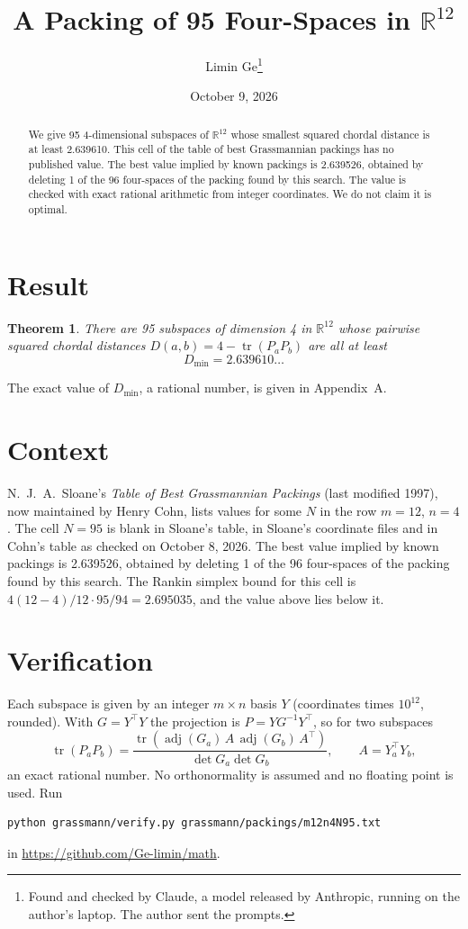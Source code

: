 \documentclass[11pt,a4paper]{article}
\title{A Packing of 95 Four-Spaces in $\mathbb{R}^{12}$}
\author{Limin Ge\thanks{Found and checked by Claude, a model released by Anthropic, running on the author's laptop. The author sent the prompts.}}
\date{October 9, 2026}
\newtheorem*{theorem}{Theorem}
\begin{document}
\maketitle
\begin{abstract}
We give 95 4-dimensional subspaces of $\mathbb{R}^{12}$ whose smallest squared chordal distance is at least 2.639610. This cell of the table of best Grassmannian packings has no published value. The best value implied by known packings is 2.639526, obtained by deleting 1 of the 96 four-spaces of the packing found by this search. The value is checked with exact rational arithmetic from integer coordinates. We do not claim it is optimal.
\end{abstract}

\section{Result}
\begin{theorem}
There are 95 subspaces of dimension 4 in $\mathbb{R}^{12}$ whose pairwise squared chordal distances $D(a,b) = 4 - \operatorname{tr}(P_aP_b)$ are all at least
\[ D_{\min} = 2.639610\ldots \]
\end{theorem}
The exact value of $D_{\min}$, a rational number, is given in Appendix~A.


\section{Context}
N.~J.~A.~Sloane's \emph{Table of Best Grassmannian Packings} (last modified 1997), now maintained by Henry Cohn, lists values for some $N$ in the row $m=12$, $n=4$. The cell $N=95$ is blank in Sloane's table, in Sloane's coordinate files and in Cohn's table as checked on October 8, 2026. The best value implied by known packings is 2.639526, obtained by deleting 1 of the 96 four-spaces of the packing found by this search. The Rankin simplex bound for this cell is $4(12-4)/12\cdot 95/94 = 2.695035$, and the value above lies below it.


\section{Verification}
Each subspace is given by an integer $m\times n$ basis $Y$ (coordinates times $10^{12}$, rounded). With $G=Y^\top Y$ the projection is $P=YG^{-1}Y^\top$, so for two subspaces
\[ \operatorname{tr}(P_aP_b)=\frac{\operatorname{tr}(\operatorname{adj}(G_a)\,A\,\operatorname{adj}(G_b)\,A^\top)}{\det G_a\det G_b},\qquad A=Y_a^\top Y_b, \]
an exact rational number. No orthonormality is assumed and no floating point is used. Run
\begin{verbatim}
python grassmann/verify.py grassmann/packings/m12n4N95.txt
\end{verbatim}
in \url{https://github.com/Ge-limin/math}.
\end{document}
